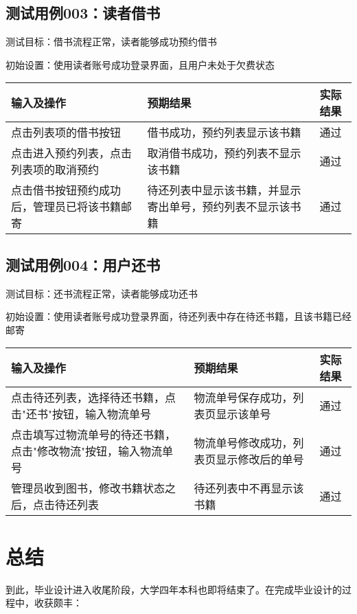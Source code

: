 \subsection{测试用例003：读者借书}
测试目标：借书流程正常，读者能够成功预约借书

初始设置：使用读者账号成功登录界面，且用户未处于欠费状态
\begin{table}[ht]
    \centering
    \begin{tabular*}{0.9\textwidth}{p{}p{}p{}}
        \hline
        输入及操作 & 预期结果 & 实际结果 \\
        \hline
        点击列表项的借书按钮 & 借书成功，预约列表显示该书籍 & 通过 \\
        点击进入预约列表，点击列表项的取消预约 & 取消借书成功，预约列表不显示该书籍 & 通过 \\
        点击借书按钮预约成功后，管理员已将该书籍邮寄 &  待还列表中显示该书籍，并显示寄出单号，预约列表不显示该书籍 & 通过 \\
        \hline
    \end{tabular*}
\end{table}
\newpage
\subsection{测试用例004：用户还书}
测试目标：还书流程正常，读者能够成功还书

初始设置：使用读者账号成功登录界面，待还列表中存在待还书籍，且该书籍已经邮寄
\begin{table}[h]
    \centering
    \begin{tabular*}{0.9\textwidth}{p{}p{}p{}}
        \hline
        输入及操作 & 预期结果 & 实际结果 \\
        \hline
        点击待还列表，选择待还书籍，点击"还书"按钮，输入物流单号 & 物流单号保存成功，列表页显示该单号 & 通过 \\
        点击填写过物流单号的待还书籍，点击"修改物流"按钮，输入物流单号 & 物流单号修改成功，列表页显示修改后的单号 & 通过 \\
        管理员收到图书，修改书籍状态之后，点击待还列表 &  待还列表中不再显示该书籍 & 通过 \\
        \hline
    \end{tabular*}
\end{table}
\newpage
\section{总结}
到此，毕业设计进入收尾阶段，大学四年本科也即将结束了。在完成毕业设计的过程中，收获颇丰：

